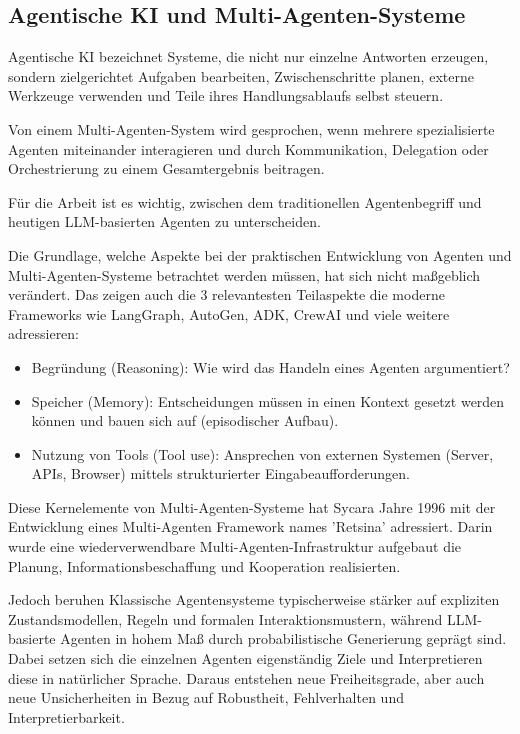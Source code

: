 \newpage

\subsection{Agentische KI und Multi-Agenten-Systeme}

Agentische KI bezeichnet Systeme, die nicht nur einzelne Antworten erzeugen, sondern zielgerichtet Aufgaben bearbeiten, Zwischenschritte planen, externe Werkzeuge verwenden und Teile ihres Handlungsablaufs selbst steuern. \cite{wooldridge_intelligent_1995,jennings_commitments_1993}

Von einem Multi-Agenten-System wird gesprochen, wenn mehrere spezialisierte Agenten miteinander interagieren und durch Kommunikation, Delegation oder Orchestrierung zu einem Gesamtergebnis beitragen.\cite{jennings_roadmap_1998,wooldridge_introduction_2002,russell_artificial_2022}

Für die Arbeit ist es wichtig, zwischen dem traditionellen Agentenbegriff und heutigen LLM-basierten Agenten zu unterscheiden. \cite{russell_artificial_2022,botti_agentic_2025} 

Die Grundlage, welche Aspekte bei der praktischen Entwicklung von Agenten und Multi-Agenten-Systeme betrachtet werden müssen, hat sich nicht maßgeblich verändert. Das zeigen auch die 3 relevantesten Teilaspekte \cite{russell_artificial_2022,jennings_roadmap_1998} die moderne Frameworks wie LangGraph, AutoGen, ADK, CrewAI und viele weitere adressieren: 
\begin{itemize}
	\item Begründung (Reasoning): Wie wird das Handeln eines Agenten argumentiert?
	\item Speicher (Memory): Entscheidungen müssen in einen Kontext gesetzt werden können und bauen sich auf (episodischer Aufbau).
	\item Nutzung von Tools (Tool use): Ansprechen von externen Systemen (Server, APIs, Browser) mittels strukturierter Eingabeaufforderungen.
\end{itemize}

Diese Kernelemente von Multi-Agenten-Systeme hat Sycara Jahre 1996 mit der Entwicklung eines Multi-Agenten Framework names 'Retsina' adressiert. Darin wurde eine wiederverwendbare Multi-Agenten-Infrastruktur aufgebaut die Planung, Informationsbeschaffung und Kooperation realisierten. \cite{sycara_distributed_1996} 

Jedoch beruhen Klassische Agentensysteme typischerweise stärker auf expliziten Zustandsmodellen, Regeln und formalen Interaktionsmustern, während LLM-basierte Agenten in hohem Maß durch probabilistische Generierung geprägt sind. \cite{wooldridge_intelligent_1995,jennings_roadmap_1998, botti_agentic_2025}
Dabei setzen sich die einzelnen Agenten eigenständig Ziele und Interpretieren diese in natürlicher Sprache. Daraus entstehen neue Freiheitsgrade, aber auch neue Unsicherheiten in Bezug auf Robustheit, Fehlverhalten und Interpretierbarkeit.  \cite{wang_large_2026, raza_trism_2026}

